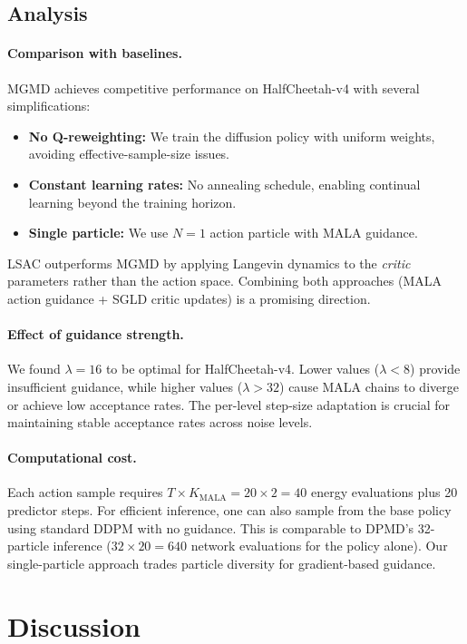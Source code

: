 \documentclass{article}
\theoremstyle{plain}
\theoremstyle{definition}
\theoremstyle{remark}
\begin{document}
\subsection{Analysis}

\paragraph{Comparison with baselines.}
MGMD achieves competitive performance on HalfCheetah-v4 with several simplifications:
\begin{itemize}
  \item \textbf{No Q-reweighting:} We train the diffusion policy with uniform weights, avoiding effective-sample-size issues.
  \item \textbf{Constant learning rates:} No annealing schedule, enabling continual learning beyond the training horizon.
  \item \textbf{Single particle:} We use $N=1$ action particle with MALA guidance.
\end{itemize}
LSAC outperforms MGMD by applying Langevin dynamics to the \emph{critic} parameters rather than the action space.
Combining both approaches (MALA action guidance + SGLD critic updates) is a promising direction.

\paragraph{Effect of guidance strength.}
We found $\lambda=16$ to be optimal for HalfCheetah-v4.
Lower values ($\lambda < 8$) provide insufficient guidance, while higher values ($\lambda > 32$) cause MALA chains to diverge or achieve low acceptance rates.
The per-level step-size adaptation is crucial for maintaining stable acceptance rates across noise levels.

\paragraph{Computational cost.}
Each action sample requires $T \times K_{\text{MALA}} = 20 \times 2 = 40$ energy evaluations plus 20 predictor steps. For efficient inference, one can also sample from the base policy using standard DDPM with no guidance.
This is comparable to DPMD's 32-particle inference ($32 \times 20 = 640$ network evaluations for the policy alone).
Our single-particle approach trades particle diversity for gradient-based guidance.


\section{Discussion}
\label{sec:discussion}
\end{document}
